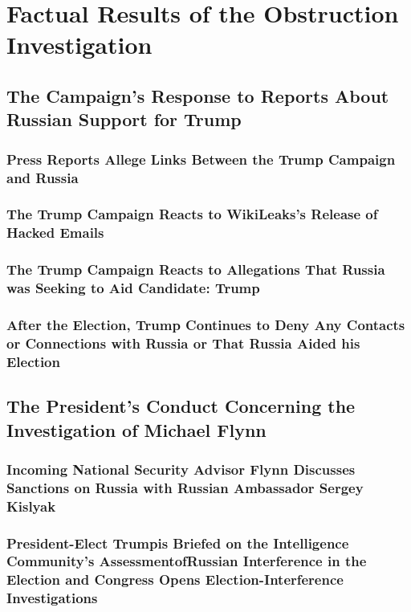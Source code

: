 \section{Factual Results of the Obstruction Investigation}

\subsection{The Campaign’s Response to Reports About Russian Support for Trump}

\subsubsection{Press Reports Allege Links Between the Trump Campaign and Russia}

\subsubsection{The Trump Campaign Reacts to WikiLeaks’s Release of Hacked Emails}

\subsubsection{The Trump Campaign Reacts to Allegations That Russia was Seeking to Aid Candidate: Trump}

\subsubsection{After the Election, Trump Continues to Deny Any Contacts or Connections with Russia or That Russia Aided his Election}

\subsection{The President’s Conduct Concerning the Investigation of Michael Flynn}

\subsubsection{Incoming National Security Advisor Flynn Discusses Sanctions on Russia with Russian Ambassador Sergey Kislyak}

\subsubsection{President-Elect Trumpis Briefed on the Intelligence Community’s AssessmentofRussian Interference in the Election and Congress Opens Election-Interference Investigations}

